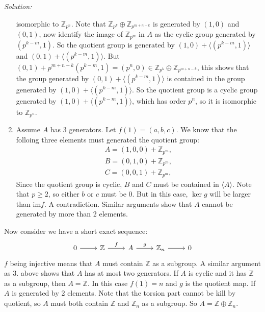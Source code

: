 \documentclass[a4paper, 11pt]{article}
\newenvironment{solution}
    {\textit{Solution:}}
    {}
\begin{document}
\begin{solution}
\begin{enumerate}
          isomorphic to \(\mathbb{Z}_{p^n}\). Note that \(\mathbb{Z}_{p^k}\oplus \mathbb{Z}_{p^{m+n-k}}\) is generated by \((1,0)\) and \((0,1)\), now identify the image of \(\mathbb{Z}_{p^m}\) in \(A\) as 
          the cyclic group generated by \((p^{k-m},1)\). So the quotient group is generated by \((1,0)+\langle (p^{k-m},1)\rangle\) and \((0,1)+\langle (p^{k-m},1)\rangle\). But \((0,1)+p^{m+n-k}(p^{k-m},1)=(p^n,0)\in \mathbb{Z}_{p^k}\oplus \mathbb{Z}_{p^{m+n-k}}\), 
          this shows that the group generated by \((0,1)+\langle (p^{k-m},1)\rangle\) is contained in the group generated by \((1,0)+\langle (p^{k-m},1)\rangle\). So the quotient group is a cyclic group generated by \((1,0)+\langle (p^{k-m},1)\rangle\), which has 
          order \(p^n\), so it is isomorphic to \(\mathbb{Z}_{p^n}\).
     \item Assume \(A\) has 3 generators. Let \(f(1)=(a,b,c)\). We know that the folloing three elements must generated the quotient group:
          \begin{align*}
            A=(1,0,0)+\mathbb{Z}_{p^m},\\ 
            B=(0,1,0)+\mathbb{Z}_{p^m},\\ 
            C=(0,0,1)+\mathbb{Z}_{p^m},
          \end{align*}
          Since the quotient group is cyclic, \(B\) and \(C\) must be contained in \(\langle A\rangle\). Note that \(p\geq 2\), so either \(b\) or \(c\) must be 0. But in this case, \(\ker g\) will be larger than 
          \(\text{im} f\). A contradiction. Similar arguments show that \(A\) cannot be generated by more than 2 elements.
\end{enumerate}
\par 
Now consider we have a short exact sequence:
$$\begin{tikzcd}
	0 & {\mathbb{Z}} & A & {\mathbb{Z}_n} & 0
	\arrow[from=1-1, to=1-2]
	\arrow["f", from=1-2, to=1-3]
	\arrow["g", from=1-3, to=1-4]
	\arrow[from=1-4, to=1-5]
\end{tikzcd}$$
\(f\) being injective means that \(A\) must contain \(\mathbb{Z}\) as a subgroup. A similar argument as 3. above shows that \(A\) has at most two generators. If \(A\) is cyclic and it has \(\mathbb{Z}\) as a subgroup, then \(A=\mathbb{Z}\). In this case \(f(1)=n\) and \(g\) is the quotient map. If 
\(A\) is generated by 2 elements. Note that the torsion part cannot be kill by quotient, so \(A\) must both contain \(\mathbb{Z}\) and \(\mathbb{Z}_n\) as a subgroup. So \(A=\mathbb{Z}\oplus \mathbb{Z}_n\).
\end{solution}
\end{document}
